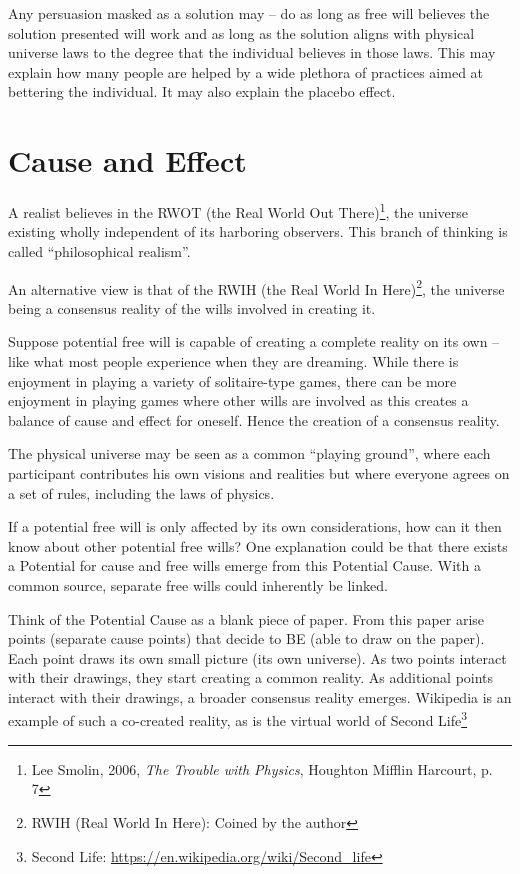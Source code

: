 \documentclass[11pt]{article}
\begin{document}
Any persuasion masked as a solution may -- do as long as free will believes the
solution presented will work and as long as the solution aligns with physical
universe laws to the degree that the individual believes in those laws. This may
explain how many people are helped by a wide plethora of practices aimed at
bettering the individual. It may also explain the placebo effect.

\section{Cause and Effect}

A realist believes in the RWOT (the Real World Out There)\footnote{ Lee Smolin,
2006, {\em The Trouble with Physics}, Houghton Mifflin Harcourt, p. 7 }, the
universe existing wholly independent of its harboring observers. This branch of
thinking is called ``philosophical realism''.

An alternative view is that of the RWIH (the Real World In Here)\footnote{ RWIH
(Real World In Here): Coined by the author}, the universe being a consensus
reality of the wills involved in creating it.

Suppose potential free will is capable of creating a complete reality on its own
-- like what most people experience when they are dreaming. While there is
enjoyment in playing a variety of solitaire-type games, there can be more
enjoyment in playing games where other wills are involved as this creates a
balance of cause and effect for oneself. Hence the creation of a consensus reality.

The physical universe may be seen as a common ``playing ground'', where each
participant contributes his own visions and realities but where everyone agrees
on a set of rules, including the laws of physics.

If a potential free will is only affected by its own considerations, how can it
then know about other potential free wills? One explanation could be that there
exists a Potential for cause and free wills emerge from this Potential Cause.
With a common source, separate free wills could inherently be linked.

Think of the Potential Cause as a blank piece of paper. From this paper arise
points (separate cause points) that decide to BE (able to draw on the paper).
Each point draws its own small picture (its own universe). As two points
interact with their drawings, they start creating a common reality. As
additional points interact with their drawings, a broader consensus reality
emerges.  Wikipedia is an example of such a co-created reality, as is the
virtual world of Second Life\footnote{ Second Life: \url{https://en.wikipedia.org/wiki/Second_life}}
\end{document}
